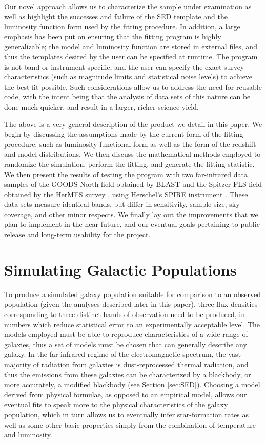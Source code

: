 \documentclass[twocolumn,letterpaper,10pt]{article}
\begin{document}
Our novel approach allows us to characterize the sample under examination as well as highlight the successes and failure of the SED template and the luminosity function form used by the fitting procedure. In addition, a large emphasis has been put on ensuring that the fitting program is highly generalizable; the model and luminosity function are stored in external files, and thus the templates desired by the user can be specified at runtime. The program is not band or instrument specific, and the user can specify the exact survey characteristics (such as magnitude limits and statistical noise levels) to achieve the best fit possible. Such considerations allow us to address the need for reusable code, with the intent being that the analysis of data sets of this nature can be done much quicker, and result in a larger, richer science yield.

The above is a very general description of the product we detail in this paper. We begin by discussing the assumptions made by the current form of the fitting procedure, such as luminosity functional form as well as the form of the redshift and model distributions. We then discuss the mathematical methods employed to randomize the simulation, perform the fitting, and generate the fitting statistic. We then present the results of testing the program with two far-infrared data samples of the GOODS-North field obtained by BLAST \citep{BLAST} and the Spitzer FLS field obtained by the HerMES survey \citep{HerMES}, using Herschel's SPIRE instrument \citep{Herschel,SPIRE}. These data sets measure identical bands, but differ in sensitivity, sample size, sky coverage, and other minor respects. We finally lay out the improvements that we plan to implement in the near future, and our eventual goals pertaining to public release and long-term usability for the project. 

\section{Simulating Galactic Populations}

To produce a simulated galaxy population suitable for comparison to an observed population (given the analyses described later in this paper), three flux densities corresponding to three distinct bands of observation need to be produced, in numbers which reduce statistical error to an experimentally acceptable level. The models employed must be able to reproduce characteristics of a wide range of galaxies, thus a set of models must be chosen that can generally describe any galaxy. In the far-infrared regime of the electromagnetic spectrum, the vast majority of radiation from galaxies is dust-reprocessed thermal radiation, and thus the emissions from these galaxies can be characterized by a blackbody, or more accurately, a modified blackbody (see Section \ref{sec:SED}). Choosing a model derived from physical formulae, as opposed to an empirical model, allows our eventual fits to speak more to the physical characteristics of the galaxy population, which in turn allows us to eventually infer star-formation rates as well as some other basic properties simply from the combination of temperature and luminosity.
\end{document}

